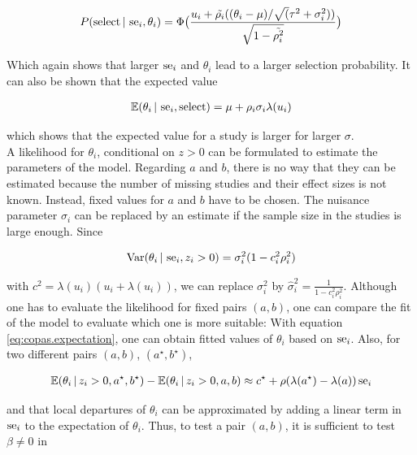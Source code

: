 \documentclass[11pt,a4paper,twoside]{book}\usepackage[]{graphicx}\usepackage[]{color}
\begin{document}
\begin{align}
P(\textrm{select} \given \se_i, \theta_i) = %
\Phi\big(\frac{u_i + \tilde{\rho_i}((\theta_i - \mu)/\sqrt(\tau^2 + \sigma_i^2))}{\sqrt{1 - \tilde{\rho_i^2}}}\big) \nonumber
\end{align}

Which again shows that larger $\operatorname{se}_i$ and $\theta_i$ lead to a larger selection probability. It can also be shown that the expected value 

\begin{align}
\mathbb{E}(\theta_i \,\vert\, \operatorname{se}_i, \textrm{select}) = \mu + \rho_i\sigma_i\lambda(u_i) \label{eq:copas.expectation}
\end{align}

which shows that the expected value for a study is larger for larger $\sigma$. \\
A likelihood for $\theta_i$, conditional on $z>0$ can be formulated to estimate the parameters of the model. Regarding $a$ and $b$, there is no way that they can be estimated because the number of missing studies and their effect sizes is not known. Instead, fixed values for $a$ and $b$ have to be chosen.
The nuisance parameter $\sigma_i$ can be replaced by an estimate if the sample size in the studies is large enough. Since

\begin{align}
\textrm{Var}(\theta_i\,\vert\, \operatorname{se}_i, z_i > 0) = \sigma_i^2 (1 - c_i^2\rho_i^2) \nonumber
\end{align}

with $c^2 = \lambda(u_i)(u_i + \lambda(u_i))$, we can replace $\sigma_i^2$ by $\hat{\sigma}_i^2 = \frac{1}{1-c_i^2\rho_i^2}$. Although one has to evaluate the likelihood for fixed pairs $(a,b)$, one can compare the fit of the model to evaluate which one is more suitable:
With equation \ref{eq:copas.expectation}, one can obtain fitted values of $\theta_i$ based on $\operatorname{se}_i$. Also, for two different pairs $(a,b)$, $(a^\star, b^\star)$,

\begin{align}
\mathbb{E}(\theta_i\,\vert\, z_i > 0, a^\star, b^\star) - \mathbb{E}(\theta_i\,\vert\, z_i > 0, a, b) \approx c^\star + \rho(\lambda(a^\star) - \lambda(a))\operatorname{se}_i \nonumber
\end{align}

and that local departures of $\theta_i$ can be approximated by adding a linear term in $\operatorname{se}_i$ to the expectation of $\theta_i$. Thus, to test a pair $(a,b)$, it is sufficient to test $\beta \neq 0$ in
\end{document}
